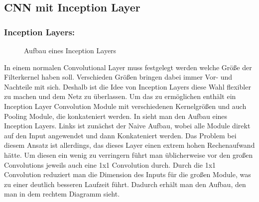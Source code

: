 \documentclass[runningheads,a4paper]{llncs}[2015/06/24]
\begin{document}
\subsection{CNN mit Inception Layer}
\subsubsection*{Inception Layers:}
\begin{figure}
	\caption{Aufbau eines Inception Layers}
	\label{fig:inception_graph}
\end{figure}
In einem normalen Convolutional Layer muss festgelegt werden welche Größe der Filterkernel haben soll. Verschieden Größen bringen dabei immer Vor- und Nachteile mit sich. Deshalb ist die Idee von Inception Layers diese Wahl flexibler zu machen und dem Netz zu überlassen. Um das zu ermöglichen enthält ein Inception Layer Convolution Module mit verschiedenen Kernelgrößen und auch Pooling Module, die konkateniert werden.
In  sieht man den Aufbau eines Inception Layers. Links ist zunächst der Naive Aufbau, wobei alle Module direkt auf den Input angewendet und dann Konkateniert werden. Das Problem bei diesem Ansatz ist allerdings, das dieses Layer einen extrem hohen Rechenaufwand hätte. Um diesen ein wenig zu verringern führt man üblicherweise vor den großen Convolutions jeweils auch eine 1x1 Convolution durch. Durch die 1x1 Convolution reduziert man die Dimension des Inputs für die großen Module, was zu einer deutlich besseren Laufzeit führt. Dadurch erhält man den Aufbau, den man in dem rechtem Diagramm sieht.
\end{document}
